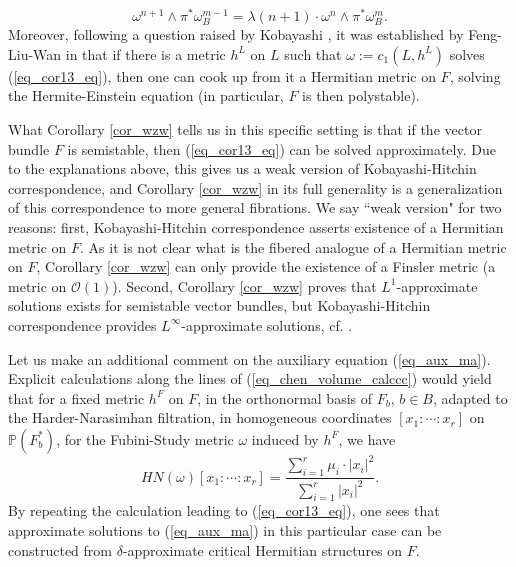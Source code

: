 \documentclass[12pt]{article}
\numberwithin{equation}{section}
\theoremstyle{theorem}
\theoremstyle{definition}
\theoremstyle{remark}
\begin{document}
	\begin{equation}\label{eq_cor13_eq}
		\omega^{n + 1} \wedge \pi^* \omega_B^{m - 1}
		=
		\lambda (n + 1) \cdot
		\omega^n \wedge \pi^* \omega_B^m.
	\end{equation}
	Moreover, following a question raised by Kobayashi \cite{KobFinEins}, it was established by Feng-Liu-Wan in \cite[Proposition 3.5]{FengLiuWang} that if there is a metric $h^L$ on $L$ such that $\omega := c_1(L, h^L)$ solves (\ref{eq_cor13_eq}), then one can cook up from it a Hermitian metric on $F$, solving the Hermite-Einstein equation (in particular, $F$ is then polystable).
	\par 
	What Corollary \ref{cor_wzw} tells us in this specific setting is that if the vector bundle $F$ is semistable, then (\ref{eq_cor13_eq}) can be solved approximately. Due to the explanations above, this gives us a weak version of Kobayashi-Hitchin correspondence, and Corollary \ref{cor_wzw} in its full generality is a generalization of this correspondence to more general fibrations.
	We say “weak version" for two reasons: first, Kobayashi-Hitchin correspondence asserts existence of a Hermitian metric on $F$.
	As it is not clear what is the fibered analogue of a Hermitian metric on $F$, Corollary \ref{cor_wzw} can only provide the existence of a Finsler metric (a metric on $\mathscr{O}(1)$).
	Second, Corollary \ref{cor_wzw} proves that $L^1$-approximate solutions exists for semistable vector bundles, but Kobayashi-Hitchin correspondence provides $L^{\infty}$-approximate solutions, cf. \cite[Theorem 6.10.13]{KobaVB}.
	\par 
	Let us make an additional comment on the auxiliary equation (\ref{eq_aux_ma}).
	Explicit calculations along the lines of (\ref{eq_chen_volume_calccc}) would yield that for a fixed metric $h^F$ on $F$, in the orthonormal basis of $F_b$, $b \in B$, adapted to the Harder-Narasimhan filtration, in homogeneous coordinates $[x_1 : \cdots : x_r]$ on $\mathbb{P}(F^*_b)$, for the Fubini-Study metric $\omega$ induced by $h^F$, we have
	\begin{equation}
		HN(\omega)[x_1 : \cdots : x_r]
		=
		\frac{\sum_{i = 1}^{r} \mu_i \cdot |x_i|^2}{\sum_{i = 1}^{r} |x_i|^2}.
	\end{equation}
	By repeating the calculation leading to (\ref{eq_cor13_eq}), one sees that approximate solutions to (\ref{eq_aux_ma}) in this particular case can be constructed from $\delta$-approximate critical Hermitian structures on $F$.
\end{document}
